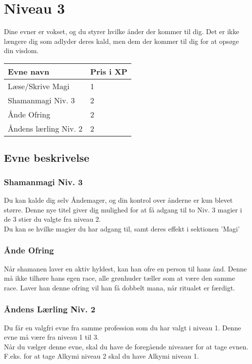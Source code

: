 \chapter*{Niveau 3}
Dine evner er vokset, og du styrer hvilke ånder der kommer til dig. Det er ikke længere dig som adlyder deres kald, men dem der kommer til dig for at opsøge din visdom.

\begin{table}[H]
    \centering
    \begin{tabular}{|p{}|p{}|}
    \rowcolor{cerulean!80}\hline
        Evne navn & Pris i XP \\\hline
        Læse/Skrive Magi & 1\\\hline
        Shamanmagi Niv. 3& 2\\\hline
        Ånde Ofring& 2\\\hline
        Åndens lærling Niv. 2& 2\\\hline
    \end{tabular}
\end{table}
\section*{Evne beskrivelse}



\subsection*{Shamanmagi Niv. 3} 
Du kan kalde dig selv Åndemager, og din kontrol over ånderne er kun blevet større. Denne nye titel giver dig mulighed for at få adgang til to Niv. 3 magier i de 3 stier du valgte fra niveau 2.\\
Du kan se hvilke magier du har adgang til, samt deres effekt i sektionen 'Magi'\\

\subsection*{Ånde Ofring} 
Når shamanen laver en aktiv hyldest, kan han ofre en person til hans ånd. Denne må ikke tilhøre hans egen race, alle grønhuder tæller som at være den samme race. Laver han denne ofring vil han få dobbelt mana, når ritualet er færdigt.

\subsection*{Åndens Lærling Niv. 2} 
Du får en valgfri evne fra samme profession som du har valgt i niveau 1. Denne evne må være fra niveau 1 til 3.\\
Når du vælger denne evne, skal du have de foregående niveauer for at tage evnen. F.eks. for at tage Alkymi niveau 2 skal du have Alkymi niveau 1.